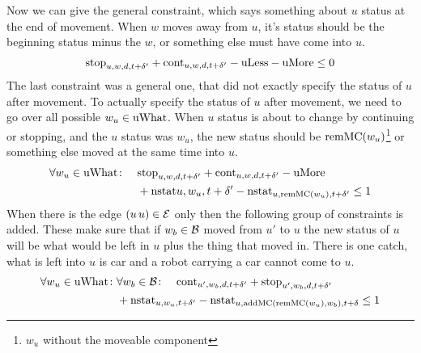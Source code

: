 Now we can give the general constraint, which says something about $u$ status
at the end of movement. When $w$ moves away from $u$, it's status should be the
beginning status minus the $w$, or something else must have come into $u$.
\begin{align}
    \mathrm{stop}_{u,w,d,t+\delta'} + \mathrm{cont}_{u,w,d,t+\delta'} - \mathrm{uLess} -\mathrm{uMore} \leq 0
\end{align}
The last constraint was a general one, that did not exactly specify the status
of $u$ after movement. To actually specify the status of $u$ after movement, we
need to go over all possible $w_u \in \mathrm{uWhat}$. When $u$ status is about to change
by continuing or stopping, and the $u$ status was $w_u$, the new status should
be $\mathrm{remMC}(w_u)$\footnote{$w_u$ without the moveable component} or something
else moved at the same time into $u$.
\begin{align}
    \begin{split}
        \forall w_u \in \mathrm{uWhat}\colon\quad &\mathrm{stop}_{u,w,d,t+\delta'} + \mathrm{cont}_{u,w,d,t+\delta'}
        - \mathrm{uMore}\\ &+ \mathrm{nstat}{u,w_u,t+\delta'} -\mathrm{nstat}_{u,\mathrm{remMC}(w_u),t+\delta'} \leq 1
    \end{split}
\end{align}
When there is the edge $(u\,u) \in \mathcal{E}$ only then the following group of
constraints is added. These make sure that if $w_b \in \mathcal{B}$ moved from $u'$ to $u$
the new status of $u$ will be what would be left in $u$ plus the thing that
moved in. There is one catch, what is left into $u$ is car and a robot carrying
a car cannot come to $u$.
\begin{align}
    \begin{split}
        \forall w_u \in \mathrm{uWhat}\colon &\forall w_b \in \mathcal{B}\colon \quad
        \mathrm{cont}_{u',w_b,d,t+\delta'} + \mathrm{stop}_{u',w_b,d,t+\delta'}\\
        &+\mathrm{nstat}_{u,w_u,t+\delta'}
        -\mathrm{nstat}_{u,\mathrm{addMC}(\mathrm{remMC}(w_u), w_b),t+\delta} \leq 1
    \end{split}
\end{align}

